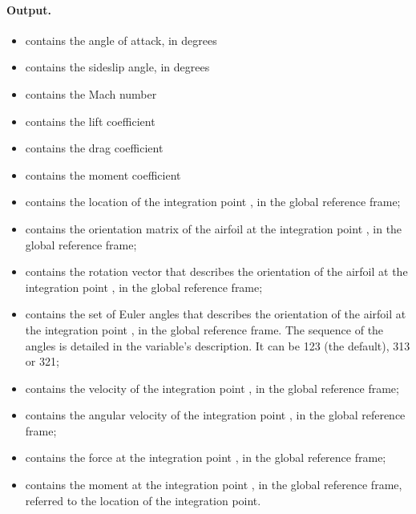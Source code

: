 \paragraph{Output.}
\begin{itemize}
\item {} contains the angle of attack, in degrees

\item {} contains the sideslip angle, in degrees

\item {} contains the Mach number

\item {} contains the lift coefficient

\item {} contains the drag coefficient

\item {} contains the moment coefficient

\item {} contains the location
of the integration point , in the global reference frame;

\item {} contains the orientation matrix
of the airfoil at the integration point , in the global reference frame;

\item {} contains the rotation vector
that describes the orientation of the airfoil at the integration point ,
in the global reference frame;

\item {} contains the set of Euler angles
that describes the orientation of the airfoil at the integration point ,
in the global reference frame.
The sequence of the angles is detailed in the variable's description.
It can be 123 (the default), 313 or 321;

\item {} contains the velocity
of the integration point , in the global reference frame;

\item {} contains the angular velocity
of the integration point , in the global reference frame;

\item {} contains the force
at the integration point , in the global reference frame;

\item {} contains the moment
at the integration point , in the global reference frame,
referred to the location of the integration point.
\end{itemize}

